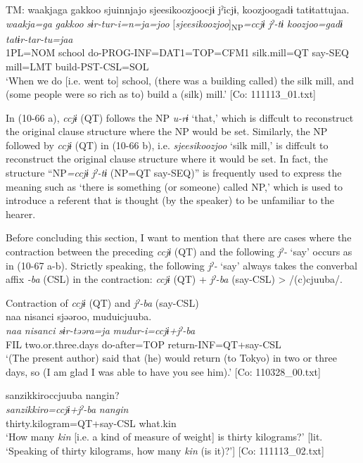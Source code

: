 \begin{xlist}
  \ex  TM:     \glll    waakjaga  {\textbar}gakkoo{\textbar}  sjuinnjajo  {\textbar}sjeesikoozjoo{\textbar}cjɨ    jˀicjɨ,  {\textbar}koozjoo{\textbar}gadɨ  tatɨtattujaa.\\
      \textit{waakja=ga}  \textit{gakkoo}  \textit{sɨr-tur-i=n=ja=joo}  [\textit{sjeesikoozjoo}]\textsubscript{NP}\textit{=ccjɨ}  \textit{jˀ{}-tɨ  koozjoo=gadɨ  tatɨr-tar-tu=jaa}\\
      1PL=NOM  school  do{}-PROG-INF=DAT1=TOP=CFM1  silk.mill=QT say-SEQ  mill=LMT  build-PST-CSL=SOL\\
      \glt       ‘When we do [i.e. went to] school, (there was a building called) the silk mill, and (some people were so rich as to) build a (silk) mill.’ [Co: 111113\_01.txt]
    \z
\z

In (10-66 a), \textit{ccjɨ} (QT) follows the NP \textit{u-rɨ} ‘that,’ which is diffcult to reconstruct the original clause structure where the NP would be set. Similarly, the NP followed by \textit{ccjɨ} (QT) in (10-66 b), i.e. \textit{sjeesikoozjoo} ‘silk mill,’ is diffcult to reconstruct the original clause structure where it would be set. In fact, the structure “NP\textit{=ccjɨ} \textit{jˀ-tɨ} (NP=QT say-SEQ)” is frequently used to express the meaning such as ‘there is something (or someone) called NP,’ which is used to introduce a referent that is thought (by the speaker) to be unfamiliar to the hearer.

  Before concluding this section, I want to mention that there are cases where the contraction between the preceding \textit{ccjɨ} (QT) and the following \textit{jˀ-} ‘say’ occurs as in (10-67 a-b). Strictly speaking, the following \textit{jˀ-} ‘say’ always takes the converbal affix \textit{{}-ba} (CSL) in the contraction: \textit{ccjɨ} (QT) + \textit{jˀ-ba} (say-CSL) > /(c)cjuuba/.

\ea\label{ex:10.67}   Contraction of \textit{ccjɨ} (QT) and \textit{jˀ-ba} (say-CSL)\\
  \ea  %
      \glll    naa  {\textbar}nisanci{\textbar}  sjəəroo,  muduicjuuba.\\
          \textit{naa}  \textit{nisanci}  \textit{sɨr-təəra=ja}  \textit{mudur-i=ccjɨ+jˀ-ba}\\
      FIL  two.or.three.days  do-after=TOP  return-INF=QT+say-CSL\\
      \glt       ‘(The present author) said that (he) would return (to Tokyo) in two or three days, so (I am glad I was able to have you see him).’ [Co: 110328\_00.txt]

  \ex  %
      \glll    {\textbar}sanzikkiro{\textbar}ccjuuba  {\textbar}nangin{\textbar}?\\
      \textit{sanzikkiro=ccjɨ+jˀ-ba}  \textit{nangin}\\
      thirty.kilogram=QT+say-CSL  what.kin\\
    \glt       ‘How many \textit{kin} [i.e. a kind of measure of weight] is thirty kilograms?’ [lit. ‘Speaking of thirty kilograms, how many \textit{kin} (is it)?’] [Co: 111113\_02.txt]
    \z
\z


\end{xlist}
